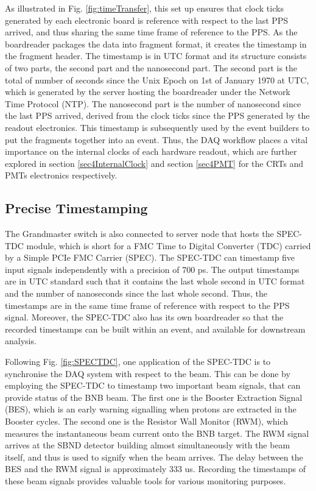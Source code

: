 As illustrated in Fig. \ref{fig:timeTransfer}, this set up ensures that clock ticks generated by each electronic board is reference with respect to the last PPS arrived, and thus sharing the same time frame of reference to the PPS.
As the boardreader packages the data into fragment format, it creates the timestamp in the fragment header.
The timestamp is in UTC format and its structure consists of two parts, the second part and the nanosecond part.
The second part is the total of number of seconds since the Unix Epoch on 1st of January 1970 at UTC, which is generated by the server hosting the boardreader under the Network Time Protocol (NTP).
The nanosecond part is the number of nanosecond since the last PPS arrived, derived from the clock ticks since the PPS generated by the readout electronics.
This timestamp is subsequently used by the event builders to put the fragments together into an event.
Thus, the DAQ workflow places a vital importance on the internal clocks of each hardware readout, which are further explored in section \ref{sec4InternalClock} and section \ref{sec4PMT} for the CRTs and PMTs electronics respectively.

\subsection{Precise Timestamping}
\label{subsec42TimeRef}

The Grandmaster switch is also connected to server node that hosts the SPEC-TDC module, which is short for a FMC Time to Digital Converter (TDC) carried by a Simple PCIe FMC Carrier (SPEC).
The SPEC-TDC can timestamp five input signals independently with a precision of 700 ps.
The output timestamps are in UTC standard such that it contains the last whole second in UTC format and the number of nanoseconds since the last whole second.
Thus, the timestamps are in the same time frame of reference with respect to the PPS signal.
Moreover, the SPEC-TDC also has its own boardreader so that the recorded timestamps can be built within an event, and available for downstream analysis.

Following Fig. \ref{fig:SPECTDC}, one application of the SPEC-TDC is to synchronise the DAQ system with respect to the beam.
This can be done by employing the SPEC-TDC to timestamp two important beam signals, that can provide status of the BNB beam.
The first one is the Booster Extraction Signal (BES), which is an early warning signalling when protons are extracted in the Booster cycles.
The second one is the Resistor Wall Monitor (RWM), which measures the instantaneous beam current onto the BNB target.
The RWM signal arrives at the SBND detector building almost simultaneously with the beam itself, and thus is used to signify when the beam arrives.
The delay between the BES and the RWM signal is approximately 333 us.
Recording the timestamps of these beam signals provides valuable tools for various monitoring purposes. 

